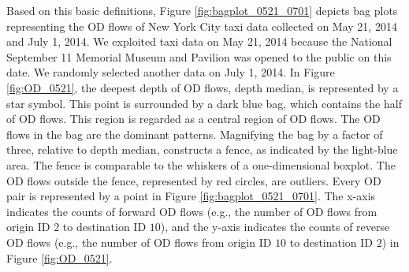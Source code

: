 \documentclass[a4paper,UKenglish]{lipics-v2018}
\begin{document}
Based on this basic definitions, Figure \ref{fig:bagplot_0521_0701} depicts bag plots representing the OD flows of New York City taxi data collected on May 21, 2014 and July 1, 2014. We exploited taxi data on May 21, 2014 because the National September 11 Memorial Museum and Pavilion was opened to the public on this date. We randomly selected another data on July 1, 2014.  In Figure \ref{fig:OD_0521}, the deepest depth of OD flows, depth median, is represented by a star symbol. This point is surrounded by  a dark blue bag, which contains the half of OD flows. This region is regarded as a central region of OD flows. The OD flows in the bag are the dominant patterns.  Magnifying the bag by a factor of three, relative to depth median, constructs a fence, as indicated by the light-blue area. The fence is comparable to the whiskers of a one-dimensional boxplot. The OD flows outside the fence, represented by red circles, are outliers. Every OD pair is represented by a point in Figure \ref{fig:bagplot_0521_0701}. The x-axis indicates the counts of forward OD flows (e.g., the number of OD flows from origin ID $2$ to destination  ID $10$), and the y-axis indicates the counts of reverse OD flows (e.g., the number of OD flows from origin ID $10$ to destination  ID $2$) in Figure \ref{fig:OD_0521}.
\end{document}
